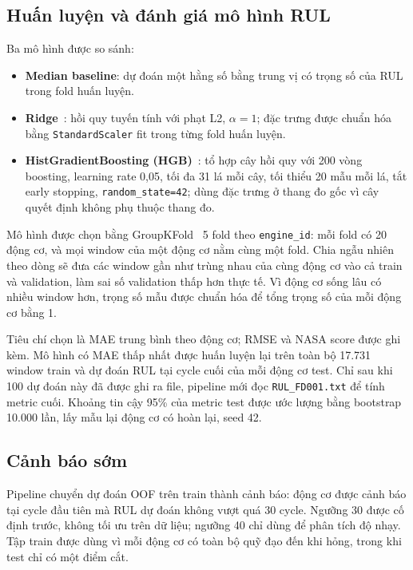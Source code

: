 \subsection{Huấn luyện và đánh giá mô hình RUL}
\label{sec:modeling}
Ba mô hình được so sánh:
\begin{itemize}
\item \textbf{Median baseline}: dự đoán một hằng số bằng trung vị có trọng số
      của RUL trong fold huấn luyện.
\item \textbf{Ridge}~\cite{sklearnRidge}: hồi quy tuyến tính với phạt L2, $\alpha=1$; đặc trưng
      được chuẩn hóa bằng \texttt{StandardScaler} fit trong từng fold huấn luyện.
\item \textbf{HistGradientBoosting (HGB)}~\cite{sklearnHistBoost,sklearnHGBAPI2026}:
      tổ hợp cây hồi quy với 200 vòng
      boosting, learning rate 0,05, tối đa 31 lá mỗi cây, tối thiểu 20 mẫu mỗi
      lá, tắt early stopping, \texttt{random\_state=42}; dùng đặc trưng ở thang
      đo gốc vì cây quyết định không phụ thuộc thang đo.
\end{itemize}

Mô hình được chọn bằng GroupKFold~\cite{sklearnGroupedCV} 5 fold theo \texttt{engine\_id}: mỗi fold có
20 động cơ, và mọi window của một động cơ nằm cùng một fold. Chia ngẫu nhiên
theo dòng sẽ đưa các window gần như trùng nhau của cùng động cơ vào cả train và
validation, làm sai số validation thấp hơn thực tế. Vì động cơ sống lâu có
nhiều window hơn, trọng số mẫu được chuẩn hóa để tổng trọng số của mỗi động cơ
bằng 1.

Tiêu chí chọn là MAE trung bình theo động cơ; RMSE và NASA score được ghi kèm.
Mô hình có MAE thấp nhất được huấn luyện lại trên toàn bộ 17.731 window train và
dự đoán RUL tại cycle cuối của mỗi động cơ test. Chỉ sau khi 100 dự đoán này đã
được ghi ra file, pipeline mới đọc \texttt{RUL\_FD001.txt} để tính metric cuối.
Khoảng tin cậy 95\% của metric test được ước lượng bằng bootstrap 10.000 lần, lấy
mẫu lại động cơ có hoàn lại, seed 42.

\subsection{Cảnh báo sớm}
\label{sec:warning-method}
Pipeline chuyển dự đoán OOF trên train thành cảnh báo: động cơ được cảnh báo tại
cycle đầu tiên mà RUL dự đoán không vượt quá 30 cycle. Ngưỡng 30 được cố định
trước, không tối ưu trên dữ liệu; ngưỡng 40 chỉ dùng để phân tích độ nhạy. Tập
train được dùng vì mỗi động cơ có toàn bộ quỹ đạo đến khi hỏng, trong khi test chỉ
có một điểm cắt.

